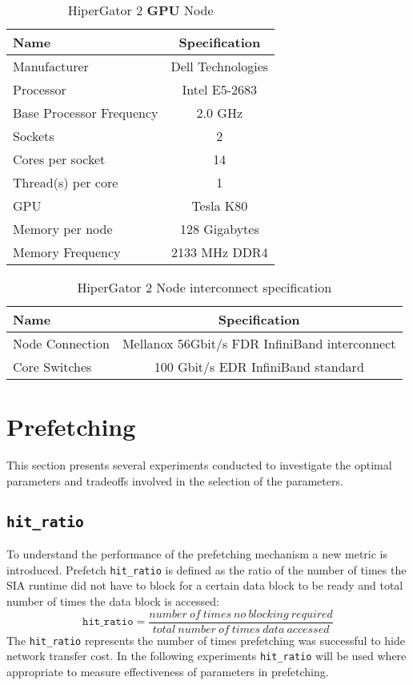 \begin{table}[h]
  \centering
  \begin{tabular}{l | c}
    \hline
    Name                       & Specification     \\
    \hline
    Manufacturer               & Dell Technologies \\
    Processor                  & Intel E5-2683     \\
    Base Processor Frequency   & 2.0 GHz           \\
    Sockets                    & 2                 \\
    Cores per socket           & 14                \\
    Thread(s) per core         & 1                 \\
    GPU                        & Tesla K80         \\
    Memory per node            & 128 Gigabytes     \\
    Memory Frequency           & 2133 MHz DDR4     \\
    \hline
  \end{tabular}
  \caption{HiperGator 2 \textbf{GPU} Node}
  \label{tab:hpggpuspecs}
\end{table}

\begin{table}[h]
  \centering
  \begin{tabular}{l | c}
    \hline
    Name             & Specification                                 \\
    \hline
    Node Connection  & Mellanox 56Gbit/s FDR InfiniBand interconnect \\
    Core Switches    & 100 Gbit/s EDR InfiniBand standard            \\
    \hline
  \end{tabular}
  \caption{HiperGator 2 Node interconnect specification}
  \label{tab:hpgconnectspecs}
\end{table}

\section{Prefetching}
This section presents several experiments conducted to investigate the optimal
parameters and tradeoffs involved in the selection of the parameters.

\subsection{\texttt{hit\_ratio}}
To understand the performance of the prefetching mechanism a new metric is introduced.
Prefetch \texttt{hit\_ratio} is defined as the ratio of the number of times the
SIA runtime did not have to block for a certain data block to be ready and total
number of times the data block is accessed:
\[
  \texttt{hit\_ratio} = \frac{number~of~times~no~blocking~required}{total~number~of~times~data~accessed}
\]
The \texttt{hit\_ratio} represents the number of times prefetching was successful
to hide network transfer cost. In the following experiments \texttt{hit\_ratio}
will be used where appropriate to measure effectiveness of parameters in prefetching.

